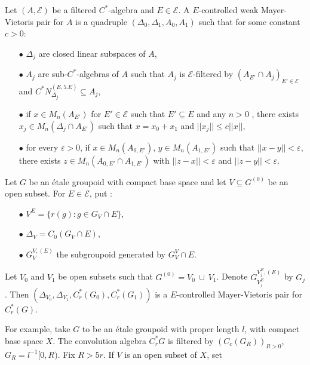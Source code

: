 \begin{definition}
Let $(A,\mathcal E)$ be a filtered $C^*$-algebra and $E \in\mathcal E$. A $E$-controlled weak Mayer-Vietoris pair for $A$ is a quadruple $(\Delta_0,\Delta_1,A_0,A_1)$ such that for some constant $c>0$:\\

\begin{itemize}
\item[$\bullet$] $\Delta_j$ are closed linear subspaces of $A$, 
\item[$\bullet$] $A_j$ are sub-$C^*$-algebras of $A$ such that $A_j$ is $\mathcal E$-filtered by $(A_{E'}\cap A_j)_{E'\in\mathcal E}$ and $C^* N_{\Delta_j}^{(E,5.E)}\subseteq A_j$,
\item[$\bullet$] if $x\in M_n(A_{E'})$ for $E'\in\mathcal E$ such that $E'\subseteq E$ and any $n>0$ , there exists $x_j\in M_n(\Delta_j\cap A_{E'})$ such that $x=x_0+x_1$ and $||x_j||\leq c||x||$,
\item[$\bullet$] for every $\varepsilon >0$, if $x\in M_n(A_{0,E'})$, $y\in M_n(A_{1,E'})$ such that $||x-y||<\varepsilon$,  there exists $z\in M_n(A_{0,E'}\cap A_{1,E'})$ with $||z-x||<\varepsilon$ and $||z-y||<\varepsilon$. \\
\end{itemize}
\end{definition}

\begin{Expl} Let $G$ be an étale groupoid with compact base space and let $V\subseteq G^{(0)}$ be an open subset. For $E\in\mathcal E$, put :
\begin{itemize}
\item[$\bullet$] $V^E= \{r(g) : g\in G_{V}\cap E\}$,
\item[$\bullet$] $\Delta_V = C_0(G_{V}\cap E)$,
\item[$\bullet$] $G^{V,(E)}_V$ the subgroupoid generated by $G_V^V \cap E$.
\end{itemize} 
Let $V_0$ and $V_1$ be open subsets such that $G^{(0)} = V_0\ \cup \ V_1$. Denote $G_{V_j^E}^{V_j^E , (E)}$ by $G_j$. Then $(\Delta_{V_0},\Delta_{V_1}, C_r^*(G_0),C_r^*(G_1))$ is a $E$-controlled Mayer-Vietoris pair for $C^*_r (G)$. 
\end{Expl}

For example, take $G$ to be an étale groupoïd with proper length $l$, with compact base space $X$. The convolution algebra $C^*_r G$ is filtered by $(C_c(G_R))_{R>0}$, $G_R=l^{-1}[0,R)$. Fix $R>5r$. If $V$ is an open subset of $X$, set \\


